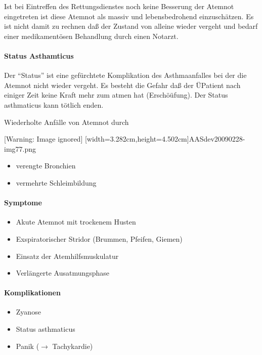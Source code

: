 Ist bei Eintreffen des Rettungsdienstes noch keine
Besserung der Atemnot eingetreten ist diese Atemnot als
massiv und lebensbedrohend einzuschätzen. Es ist nicht
damit zu rechnen daß der Zustand von alleine wieder vergeht
und bedarf einer medikamentösen Behandlung durch einen
Notarzt. 

\paragraph{Status Asthamticus} Der "`Status"' ist eine
gefürchtete Komplikation des Asthmaanfalles bei der die
Atemnot nicht wieder vergeht. Es besteht die Gefahr daß der
ÜPatient nach einiger Zeit keine Kraft mehr zum atmen hat
(Erschöüfung). Der Status asthmaticus kann tötlich enden. 

Wiederholte Anfälle von Atemnot durch

\begin{center}
[Warning: Image ignored] [width=3.282cm,height=4.502cm]{AASdev20090228-img77.png}
\end{center}
\begin{itemize}
    \item {\mdseries verengte Bronchien}
    
    \item {\mdseries vermehrte Schleimbildung}
    
\end{itemize}

\paragraph{ Symptome}

\begin{itemize}
    \item Akute Atemnot mit trockenem Husten
    \item Exspiratorischer Stridor (Brummen, Pfeifen, Giemen)
    \item Einsatz der Atemhilfsmuskulatur
    \item Verlängerte Ausatmungsphase
\end{itemize}

\paragraph*{Komplikationen}

\begin{itemize}
    \item Zyanose
    \item Status asthmaticus
    \item Panik (${\rightarrow}$ Tachykardie)
\end{itemize}

